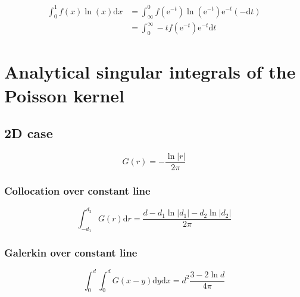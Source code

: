 \documentclass[a4paper,10pt,twocolumn]{article}
\newcommand{\td}{\mathrm{d}}
\newcommand{\te}{\mathrm{e}}
\begin{document}
\begin{align}
\int_0^1 f(x) \ln(x) \td x
& = \int_{\infty}^0 f(\te^{-t}) \ln(\te^{-t}) \te^{-t} (-\td t) \nonumber \\
& = \int_{0}^{\infty} -t f(\te^{-t}) \te^{-t} \td t
\end{align}


\section{Analytical singular integrals of the Poisson kernel}

\subsection{2D case}

\begin{equation}
G(r) = -\frac{\ln |r|}{2\pi}
\end{equation}

\subsubsection{Collocation over constant line}

\begin{equation}
\int_{-d_1}^{d_2} G(r) \td r
=
\frac{d - d_1 \ln |d_1| - d_2 \ln |d_2|}{2\pi}
\end{equation}


\subsubsection{Galerkin over constant line}

\begin{equation}
\int_{0}^{d} \int_{0}^{d} G(x-y) \td y \td x
=
d^2\frac{3-2\ln d}{4\pi}
\end{equation}
\end{document}

